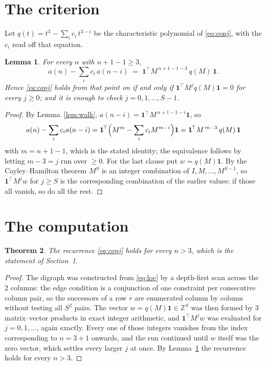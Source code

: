 \documentclass[11pt,a4paper]{article}
\theoremstyle{plain}
\newtheorem{theorem}{Theorem}
\newtheorem{lemma}[theorem]{Lemma}
\theoremstyle{definition}
\begin{document}
\section{The criterion}

Let $q(t)=t^{3}-\sum_i c_i\,t^{3-i}$ be the characteristic polynomial of
\eqref{eq:conj}, with the $c_i$ read off that equation.

\begin{lemma}\label{lem:crit}
For every $n$ with $n+1-1\ge3$,
\[
a(n)-\sum_i c_i\,a(n-i)\;=\;\mathbf{1}^{\!\top}M^{\,n+1-1-3}\,q(M)\,\mathbf{1} .
\]
Hence \eqref{eq:conj} holds from that point on if and only if
$\mathbf{1}^{\!\top}M^{j}q(M)\mathbf{1}=0$ for every $j\ge0$; and it is enough to check
$j=0,1,\dots,S-1$.
\end{lemma}

\begin{proof}
By Lemma~\ref{lem:walk}, $a(n-i)=\mathbf{1}^{\!\top}M^{\,n+1-1-i}\mathbf{1}$, so
\[
a(n)-\sum_i c_i a(n-i)
=\mathbf{1}^{\!\top}\Bigl(M^{m}-\sum_i c_i M^{m-i}\Bigr)\mathbf{1}
=\mathbf{1}^{\!\top}M^{\,m-3}\,q(M)\,\mathbf{1}
\]
with $m=n+1-1$, which is the stated identity; the equivalence follows by letting
$m-3=j$ run over $\ge0$. For the last clause put $w=q(M)\mathbf{1}$. By the
Cayley--Hamilton theorem $M^{S}$ is an integer combination of $I,M,\dots,M^{S-1}$, so
$\mathbf{1}^{\!\top}M^{j}w$ for $j\ge S$ is the corresponding combination of the earlier
values; if those all vanish, so do all the rest.
\end{proof}

\section{The computation}

\begin{theorem}
The recurrence \eqref{eq:conj} holds for every $n>3$, which is the statement of
Section~1.
\end{theorem}

\begin{proof}
The digraph was constructed from \eqref{eq:loc} by a depth-first scan across the $2$
columns: the edge condition is a conjunction of one constraint per consecutive column
pair, so the successors of a row $r$ are enumerated column by column without testing all
$S^2$ pairs. The vector $w=q(M)\mathbf{1}\in\mathbb{Z}^{S}$ was then formed by $3$
matrix--vector products in exact integer arithmetic, and $\mathbf{1}^{\!\top}M^{j}w$ was
evaluated for $j=0,1,\dots$, again exactly. Every one of those integers vanishes from the
index corresponding to $n=3+1$ onwards, and the run continued until $w$ itself was the
zero vector, which settles every larger $j$ at once. By Lemma~\ref{lem:crit} the recurrence
holds for every $n>3$.
\end{proof}
\end{document}
